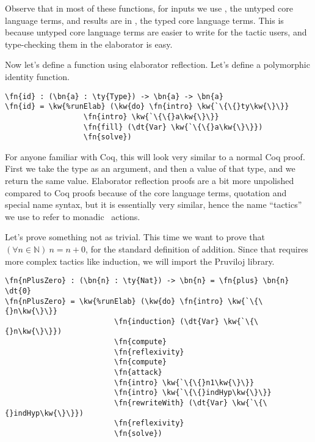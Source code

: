 Observe that in most of these functions, for inputs we use , the
untyped core language terms, and results are in , the typed core
language terms.  This is because untyped core language terms are easier to
write for the tactic users, and type-checking them in the elaborator is easy.

Now let's define a function using elaborator reflection.
Let's define a polymorphic identity function.

\begin{Verbatim}[framesep=2mm, label=\footnotesize{\normalfont{Idris}}, labelposition=topline]
\fn{id} : (\bn{a} : \ty{Type}) -> \bn{a} -> \bn{a}
\fn{id} = \kw{%runElab} (\kw{do} \fn{intro} \kw{`\{\{}ty\kw{\}\}}
                  \fn{intro} \kw{`\{\{}a\kw{\}\}}
                  \fn{fill} (\dt{Var} \kw{`\{\{}a\kw{\}\}})
                  \fn{solve})
\end{Verbatim}

For anyone familiar with Coq, this will look very similar to a normal Coq
proof. First we take the type as an argument, and then a value of that type,
and we return the same value. Elaborator reflection proofs are a bit more
unpolished compared to Coq proofs because of the core language terms,
quotation and special name syntax, but it is essentially very similar,
hence the name ``tactics'' we use to refer to monadic \Elab\ actions.

Let's prove something not as trivial. This time we want to prove that
$(\forall n \in \mathbb{N})\ n = n + 0$, for the standard definition of addition. Since that requires more complex tactics like induction, we will import the Pruviloj library.\cite{davidphd}

\begin{Verbatim}[framesep=2mm, label=\footnotesize{\normalfont{Idris}}, labelposition=topline]
\fn{nPlusZero} : (\bn{n} : \ty{Nat}) -> \bn{n} = \fn{plus} \bn{n} \dt{0}
\fn{nPlusZero} = \kw{%runElab} (\kw{do} \fn{intro} \kw{`\{\{}n\kw{\}\}}
                         \fn{induction} (\dt{Var} \kw{`\{\{}n\kw{\}\}})
                         \fn{compute}
                         \fn{reflexivity}
                         \fn{compute}
                         \fn{attack}
                         \fn{intro} \kw{`\{\{}n1\kw{\}\}}
                         \fn{intro} \kw{`\{\{}indHyp\kw{\}\}}
                         \fn{rewriteWith} (\dt{Var} \kw{`\{\{}indHyp\kw{\}\}})
                         \fn{reflexivity}
                         \fn{solve})
\end{Verbatim}

